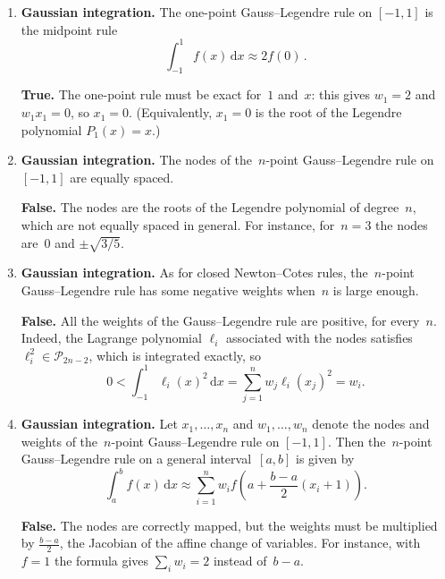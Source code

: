 \documentclass[a4paper]{article}
\renewcommand{\d}{\mathrm d}
\newcommand{\answer}[1]{%
    \ifdefined\showsolutions
        \par\smallskip
        {\small\color{blue!60!black}#1\par}
    \fi
}
\begin{document}
\begin{enumerate}
    \item
        \textbf{Gaussian integration.}
        The one-point Gauss--Legendre rule on $[-1, 1]$ is the midpoint rule
        \[
            \int_{-1}^1 f(x) \, \d x \approx 2 f(0)\,.
        \]
        \answer{\textbf{True.}
        The one-point rule must be exact for~$1$ and~$x$: this gives $w_1 = 2$ and $w_1 x_1 = 0$, so $x_1 = 0$.
        (Equivalently, $x_1 = 0$ is the root of the Legendre polynomial $P_1(x) = x$.)}

    \item
        \textbf{Gaussian integration.}
        The nodes of the~$n$-point Gauss--Legendre rule on $[-1, 1]$ are equally spaced.
        \answer{\textbf{False.}
        The nodes are the roots of the Legendre polynomial of degree~$n$, which are not equally spaced in general.
        For instance, for~$n = 3$ the nodes are~$0$ and $\pm \sqrt{3/5}$.}

    \item
        \textbf{Gaussian integration.}
        As for closed Newton--Cotes rules, the~$n$-point Gauss--Legendre rule has some negative weights when~$n$ is large enough.
        \answer{\textbf{False.}
        All the weights of the Gauss--Legendre rule are positive, for every~$n$.
        Indeed, the Lagrange polynomial $\ell_i$ associated with the nodes satisfies $\ell_i^2 \in \mathcal P_{2n-2}$,
        which is integrated exactly, so
        \[
            0 < \int_{-1}^{1} \ell_i(x)^2 \, \d x = \sum_{j=1}^{n} w_j \ell_i(x_j)^2 = w_i.
        \]}

    \item
        \textbf{Gaussian integration.}
        Let $x_1, \dotsc, x_n$ and $w_1, \dotsc, w_n$ denote the nodes and weights of the~$n$-point Gauss--Legendre rule on $[-1, 1]$.
        Then the~$n$-point Gauss--Legendre rule on a general interval~$[a, b]$ is given by
        \[
            \int_a^b f(x) \, \d x \approx \sum_{i=1}^{n} w_i f\left( a + \frac{b-a}{2} (x_i + 1) \right).
        \]
        \answer{\textbf{False.}
        The nodes are correctly mapped, but the weights must be multiplied by $\frac{b-a}{2}$,
        the Jacobian of the affine change of variables.
        For instance, with~$f = 1$ the formula gives $\sum_i w_i = 2$ instead of~$b - a$.}


\end{enumerate}
\end{document}
